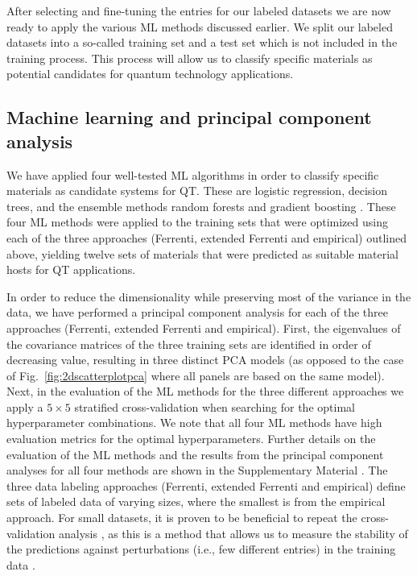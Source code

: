 \documentclass[superscriptaddress,unsortedaddress,
 amsmath,amssymb,
 aps,
]{revtex4-2}
\begin{document}
After selecting and fine-tuning the entries for our labeled datasets we are now ready to apply the various ML methods discussed earlier. We split our labeled datasets into a so-called training set and a test set which is not included in the training process. This process will allow us to classify specific materials as potential candidates for quantum technology applications. 

\subsection*{Machine learning and principal component analysis}
We have applied four well-tested ML algorithms in order to classify specific materials as candidate systems for QT. These are logistic regression, decision trees, and the ensemble methods random forests and gradient boosting \cite{Mehta2019,Hastie2009,Murphy2012}. 
These four ML methods were applied to the training sets that were optimized using each of the three approaches (Ferrenti, extended Ferrenti and empirical) outlined above, yielding twelve sets of materials that were predicted as suitable material hosts for QT applications.  

In order to reduce the dimensionality while preserving most of the variance in the data, 
we have performed a principal component analysis  \cite{Jolliffe2002} for each of the three approaches (Ferrenti, extended Ferrenti and empirical).
First, the eigenvalues of the covariance matrices of the three training sets are identified in order of decreasing value, resulting in three distinct PCA models (as opposed to the case of Fig.~\ref{fig:2dscatterplotpca} where all panels are based on the same model). 
%
Next, in the evaluation of the ML methods for the three different approaches we apply a $5\times 5$ stratified cross-validation \cite{Hastie2009} when searching for the optimal hyperparameter combinations. We note that all four ML methods have high evaluation metrics for the optimal hyperparameters. Further details on the evaluation of the ML methods and the results from the principal component analyses for all four methods are shown in the Supplementary Material \cite{supplementary}.  
%
The three data labeling approaches (Ferrenti, extended Ferrenti and empirical) define sets of labeled data of varying sizes, where the smallest is from the empirical approach. For small datasets, it is proven to be beneficial to repeat the cross-validation analysis \cite{Hastie2009}, as this is a method that allows us to measure the stability of the predictions against perturbations (i.e., few different entries) in the training data \cite{Beleites2008}.
\end{document}
